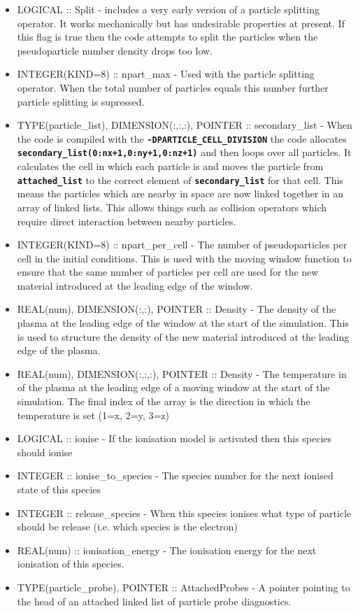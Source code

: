 \documentclass[12pt,a4paper]{article}
\newcommand{\inlinecode}[1]{{\color{warwickred} \bf\texttt{#1}}}
\newcommand{\EPOCH}{{\color{warwickdark}\fontfamily{phv}\selectfont{EPOCH}}}
\begin{document}
\begin{itemize}
\item LOGICAL :: Split - {\EPOCH} includes a very early version of a particle
  splitting operator. It works mechanically but has undesirable properties at
  present. If this flag is true then the code attempts to split the particles
  when the pseudoparticle number density drops too low.
\item INTEGER(KIND=8) :: npart\_max - Used with the particle splitting
  operator. When the total number of particles equals this number further
  particle splitting is supressed.
\item TYPE(particle\_list), DIMENSION(:,:,:), POINTER :: secondary\_list - When the
  code is compiled with the \inlinecode{-DPARTICLE\_CELL\_DIVISION} the code
  allocates \inlinecode{secondary\_list(0:nx+1,0:ny+1,0:nz+1)} and then loops
  over all particles. It calculates the cell in which each particle is and
  moves the particle from \inlinecode{attached\_list} to the correct element of
  \inlinecode{secondary\_list} for that cell. This means the particles which are
  nearby in space are now linked together in an array of linked lists. This
  allows things such as collision operators which require direct interaction
  between nearby particles.
\item INTEGER(KIND=8) :: npart\_per\_cell - The number of pseudoparticles per
  cell in the initial conditions. This is used with the moving window function
  to ensure that the same number of particles per cell are used for the new
  material introduced at the leading edge of the window.
\item REAL(num), DIMENSION(:,:), POINTER :: Density - The density of the plasma
  at the leading edge of the window at the start of the simulation. This is
  used to structure the density of the new material introduced at the leading
  edge of the plasma.
\item REAL(num), DIMENSION(:,:,:), POINTER :: Density - The temperature in of
  the plasma at the leading edge of a moving window at the start of the
  simulation. The final index of the array is the direction in which the
  temperature is set (1=x, 2=y, 3=z)
\item LOGICAL :: ionise - If the ionisation model is activated then this
  species should ionise
\item INTEGER :: ionise\_to\_species - The species number for the next ionised
  state of this species
\item INTEGER :: release\_species - When this species ionises what type of
  particle should be release (i.e. which species is the electron)
\item REAL(num) :: ionisation\_energy - The ionisation energy for the next
  ionisation of this species.
\item TYPE(particle\_probe), POINTER :: AttachedProbes - A pointer pointing to
  the head of an attached linked list of particle probe diagnostics.
\end{itemize}
\end{document}
